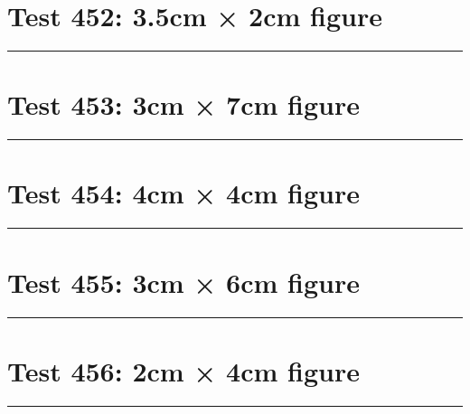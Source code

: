 \documentclass[a4paper,11pt]{article}
\begin{document}
\section*{Test 452: 3.5cm × 2cm figure}
\begin{swarmwrap}%
  \begin{minipage}[t]{3cm}
    \centering
    \rule{\linewidth}{2cm}
  \end{minipage}%
\end{swarmwrap}%
\swarmwrapnext
\lipsum[117]
\lipsum[118]
\lipsum[119]
\lipsum[120]
\section*{Test 453: 3cm × 7cm figure}
\begin{swarmwrap}%
  \begin{minipage}[t]{3cm}
    \centering
    \rule{\linewidth}{7cm}
  \end{minipage}%
\end{swarmwrap}%
\swarmwrapnext
\lipsum[21]
\lipsum[22]
\lipsum[23]
\lipsum[24]
\lipsum[25]
\lipsum[26]
\section*{Test 454: 4cm × 4cm figure}
\begin{swarmwrap}%
  \begin{minipage}[t]{4cm}
    \centering
    \rule{\linewidth}{4cm}
  \end{minipage}%
\end{swarmwrap}%
\swarmwrapnext
\lipsum[103]
\lipsum[104]
\lipsum[105]
\lipsum[106]
\lipsum[107]
\section*{Test 455: 3cm × 6cm figure}
\begin{swarmwrap}%
  \begin{minipage}[t]{3cm}
    \centering
    \rule{\linewidth}{6cm}
  \end{minipage}%
\end{swarmwrap}%
\swarmwrapnext
\lipsum[31]
\lipsum[32]
\lipsum[33]
\lipsum[34]
\section*{Test 456: 2cm × 4cm figure}
\begin{swarmwrap}%
  \begin{minipage}[t]{2cm}
    \centering
    \rule{\linewidth}{4cm}
  \end{minipage}%
\end{swarmwrap}%
\swarmwrapnext
\lipsum[134]
\lipsum[135]
\lipsum[136]
\lipsum[137]
\lipsum[138]
\lipsum[139]
\end{document}
